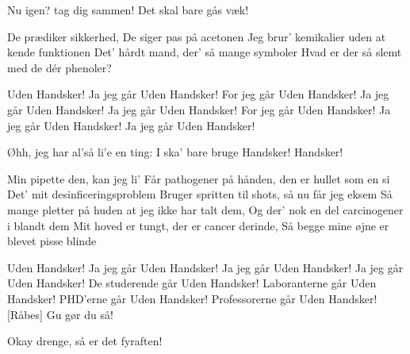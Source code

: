 \documentclass[a4paper,11pt]{article}
\begin{document}
\begin{song}
  Nu igen? tag dig sammen! Det skal bare gås væk!

  De prædiker sikkerhed, De siger pas på acetonen
  Jeg brur' kemikalier uden at kende funktionen
  Det' hårdt mand, der' så mange symboler
  Hvad er der så slemt med de dér phenoler?

  Uden Handsker! 
   Ja jeg går
    Uden Handsker!
   For jeg går
   Uden Handsker!
   Ja jeg går
   Uden Handsker!
   Ja jeg går
    Uden Handsker!
   For jeg går
   Uden Handsker!
   Ja jeg går
   Uden Handsker!
   Ja jeg går
   Uden Handsker!
  
  Øhh, jeg har al'så li'e en ting: I ska' bare bruge Handsker! 
  Handsker!

  Min pipette den, kan jeg li’
  Får pathogener på hånden, den er hullet som en si
  Det’ mit desinficeringsproblem
  Bruger spritten til shots, så nu får jeg eksem
  Så mange pletter på huden at jeg ikke har talt dem,
  Og der’ nok en del carcinogener i blandt dem
  Mit hoved er tungt, der er cancer derinde,
  Så begge mine øjne er blevet pisse blinde

  Uden Handsker! 
   Ja jeg går
  Uden Handsker! 
   Ja jeg går
  Uden Handsker! 
   Ja jeg går
  Uden Handsker! 
   De studerende går
  Uden Handsker! 
   Laboranterne går
  Uden Handsker! 
   PHD'erne går
  Uden Handsker! 
   Professorerne går
  Uden Handsker!
  [Råbes] Gu gør du så!

   Okay drenge, så er det fyraften!

\end{song}
\end{document}
